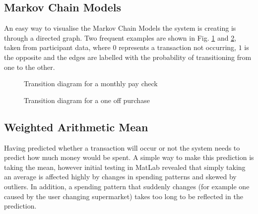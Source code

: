 \subsection{Markov Chain Models}

An easy way to visualise the Markov Chain Models the system is creating is through a directed graph. Two frequent examples are shown in Fig. \ref{fig:transition-monthly} and \ref{fig:transition-one}, taken from participant data, where $0$ represents a transaction not occurring, $1$ is the opposite and the edges are labelled with the probability of transitioning from one to the other. 

\begin{figure}[h]
\centering
{}
\caption{Transition diagram for a monthly pay check}
\label{fig:transition-monthly}
\end{figure}

\begin{figure}[h]
\centering
{}
\caption{Transition diagram for a one off purchase}
\label{fig:transition-one}
\end{figure}

\subsection{Weighted Arithmetic Mean}
Having predicted whether a transaction will occur or not the system needs to predict how much money would be spent. A simple way to make this prediction is taking the mean, however initial testing in MatLab revealed that simply taking an average is affected highly by changes in spending patterns and skewed by outliers. In addition, a spending pattern that suddenly changes (for example one caused by the user changing supermarket) takes too long to be reflected in the prediction.

